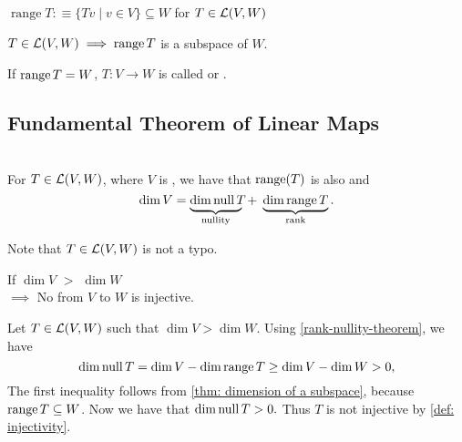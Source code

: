 \setcounter{thm}{15}
\begin{mydef} [range]
  $\operatorname{range}T :\equiv \{Tv \mid v \in V\} \subseteq W$ for $T \in {\mathcal{L}(V,W)}$
\end{mydef}

\setcounter{thm}{17}
\begin{thm} 
  \label{thm: the range is a subspace}
  $T\in \mathcal{L}(V,W) \implies \operatorname{range} T$ is a subspace of $W$.
\end{thm}

\setcounter{thm}{18}
\begin{mydef} [surjectivity]
  \label{def: surjectivity}
  If $\operatorname{range} T=W$, $T:V\to W$ is called  or .
\end{mydef}

\subsection{Fundamental Theorem of Linear Maps}

  \setcounter{thm}{20}
  \begin{thm} 
    \label{rank-nullity-theorem}
    \phantom{.} \\
    For $T \in \mathcal{L}(V,W)$, where $V$ is \fd, we have that $\operatorname{range}(T)$ is also \fd and
    \begin{equation}
      \dim V =
      \underbrace{ \dim\operatorname{null} T\phantom{g}\!\!\!\!\!}_{\text{nullity}}
      \; + \; \underbrace{\dim \operatorname{range} T}_{\text{rank}}.
    \end{equation}

    Note that $T \in \mathcal{L}(V,W)$ is not a typo.
  \end{thm}

  \setcounter{thm}{21}
  \begin{thm} 
    \label{thm: linear-map-to-a-lower-dimensional-space-is-not-injective}
    If $\dim V$ $>$ $\dim W$ \\
    $\implies$ No \lm from $V$ to $W$ is injective.
  \end{thm}
  \begin{prf} Let $T\in \mathcal{L}(V,W)$ such that $\dim V > \dim W$. Using \ref{rank-nullity-theorem}, we have
    \begin{equation}
      \dim \operatorname{null} T = \dim V - \dim \operatorname{range} T \geq \dim V - \dim W > 0,
    \end{equation}
    The first inequality follows from \ref{thm: dimension of a subspace}, because $\operatorname{range} T \subseteq W$. Now we have that $\dim \operatorname{null} T > 0.$ Thus $T$ is not injective by \ref{def: injectivity}.
  \end{prf}

